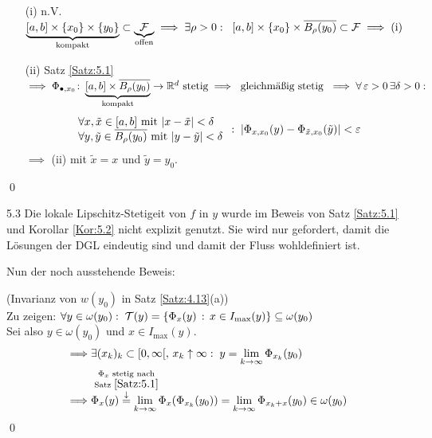 \documentclass[a4paper]{article}
\begin{document}
\begin{Beweis}
\begin{itemize}
\item[(i)] n.V. $\underbrace{[a,b]\times\{x_0\}\times\{y_0\}}_{\text{kompakt}}\subset\underbrace{\operatorname{\mathcal{F}}}_{\text{offen}}\implies \exists \rho>0:\;\;[a,b]\times\{x_0\}\times\overline{B_{\rho}(y_0)}\subset \operatorname{\mathcal{F}}\implies \text{(i)}$
\item[(ii)] Satz \ref{Satz:5.1} $\implies \Phi_{\bullet,x_0}\colon \underbrace{[a,b]\times\overline{B_{\rho}(y_0)}}_{\text{kompakt}}\to\mathbb R^d\text{ stetig}\implies \text{ gleichmäßig stetig } \implies \forall \operatorname{\varepsilon}>0\,\exists\delta>0:$
\[\begin{array}{l}
\displaystyle\forall x,\tilde{x}\in [a,b]\text{ mit }|x-\tilde{x}|<\delta\\
\displaystyle\forall y,\tilde{y}\in\overline{B_{\rho}(y_0)}\text{ mit }|y-\tilde{y}|<\delta
\end{array}
:\;
|\Phi_{x,x_0}(y)-\Phi_{\tilde{x},x_0}(\tilde{y})|<\operatorname{\varepsilon}\]
$\implies$ (ii) mit $\tilde{x}=x$ und $\tilde{y}=y_0$.
\end{itemize}\qed
\end{Beweis}

\begin{Bemerkung}{}{5.3}
Die lokale Lipschitz-Stetigeit von $f$ in $y$ wurde im Beweis von Satz \ref{Satz:5.1} und Korollar \ref{Kor:5.2} nicht explizit genutzt. Sie wird nur gefordert, damit die Lösungen der DGL eindeutig sind und damit der Fluss wohldefiniert ist.
\end{Bemerkung}
Nun der noch ausstehende Beweis:
\begin{Beweis}
(Invarianz von $w(y_0)$ in Satz \ref{Satz:4.13}(a))\\
Zu zeigen: $\forall y\in \omega(y_0):\;\operatorname{\mathcal{T}}(y)=\{\Phi_x(y)\,:\,x\in I_{\max}(y)\}\subseteq \omega(y_0)$\\
Sei also $y\in \omega(y_0)$ und $x\in I_{\max}(y)$.
\begin{align*}
\implies& \exists (x_k)_k\subset[0,\infty[,\,x_k\uparrow\infty:\; y=\lim_{k\to\infty}\Phi_{x_k}(y_0)\\
\implies& \Phi_x(y)
\overset{\mathclap{
\substack{\Phi_x\te{stetig nach}\\\text{Satz }\ref{Satz:5.1}\\\downarrow}}}{=}\lim_{k\to\infty}\Phi_x(\Phi_{x_k}(y_0))=\lim_{k\to\infty}\Phi_{x_k+x}(y_0)\in\omega(y_0)
\end{align*}\qed
\end{Beweis}
\end{document}
